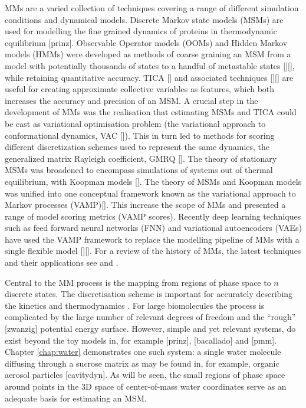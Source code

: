 MMs are a varied collection of techniques covering a range of different simulation conditions and dynamical models. Discrete Markov state models (MSMs) are used for modelling the fine grained dynamics of proteins in thermodynamic equilibrium [prinz].  Observable Operator models (OOMs) and Hidden Markov models (HMMs) were developed as methods of coarse graining an MSM from a model with potentially thousands of states to a handful of metastable states [][], while retaining quantitative accuracy.   TICA [] and associated techniques [][] are useful for creating approximate collective variables as features, which both increases the accuracy and precision of an MSM. A crucial step in the development of MMs was the realisation that estimating MSMs and TICA could be cast as variational optimisation problem (the variational approach to conformational dynamics, VAC []). This in turn led to methods for scoring different discretization schemes used to represent the same dynamics, the generalized matrix Rayleigh coefficient, GMRQ []. The theory of stationary MSMs was broadened to encompass simulations of systems out of thermal equilibrium, with Koopman models []. The theory of MSMs and Koopman models was unified into one conceptual framework known as the variational approach to Markov processes (VAMP)[]. This increase the scope of MMs and presented a range of model scoring metrics (VAMP scores). Recently deep learning techniques such as feed forward neural networks (FNN) and variational autoencoders (VAEs) have used the VAMP framework to replace the modelling pipeline of MMs with a single flexible model [][]. For a review of the history of MMs, the latest techniques and their applications see \cite{husicMarkovStateModels2018} and \cite{noeMarkovModelsMolecular2019b}. 

Central to the MM process is the mapping from regions of phase space to $n$ discrete states. The discretisation scheme is important for accurately describing the kinetics and thermodynamics \cite{shallowayMacrostatesClassicalStochastic1996}. For large biomolecules the process is complicated by the large number of relevant degrees of freedom \cite{shallowayMacrostatesClassicalStochastic1996} and the ``rough'' [zwanzig] potential energy surface. However, simple and yet relevant systems, do exist beyond the toy models in, for example [prinz], [bacallado] and [pmm]. Chapter \ref{chap:water} demonstrates one such system: a single water molecule diffusing through a sucrose matrix as may be found in, for example, organic aerosol particles [cavitydyn]. As will be seen, the small regions of phase space around points in the 3D space of center-of-mass water coordinates serve as an adequate basis for estimating an MSM. 

